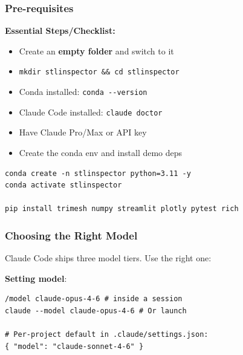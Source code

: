\begin{frame}[fragile]\frametitle{Pre-requisites}

\textbf{Essential Steps/Checklist:}
  \begin{itemize}
    \item Create an \textbf{empty folder} and switch to it
	\item \lstinline|mkdir stlinspector && cd stlinspector|
    \item Conda installed: \lstinline|conda --version|
    \item Claude Code installed: \lstinline|claude doctor|
    \item Have Claude Pro/Max or API key
	\item Create the conda env and install demo deps
  \end{itemize}

\begin{lstlisting}
conda create -n stlinspector python=3.11 -y
conda activate stlinspector

pip install trimesh numpy streamlit plotly pytest rich
\end{lstlisting}
\end{frame}


\begin{frame}[fragile]\frametitle{Choosing the Right Model}
Claude Code ships three model tiers. Use the right one:

\begin{center}
\end{center}

\textbf{Setting model}:
\begin{lstlisting}
/model claude-opus-4-6 # inside a session
claude --model claude-opus-4-6 # Or launch

# Per-project default in .claude/settings.json:
{ "model": "claude-sonnet-4-6" }
\end{lstlisting}
\end{frame}


